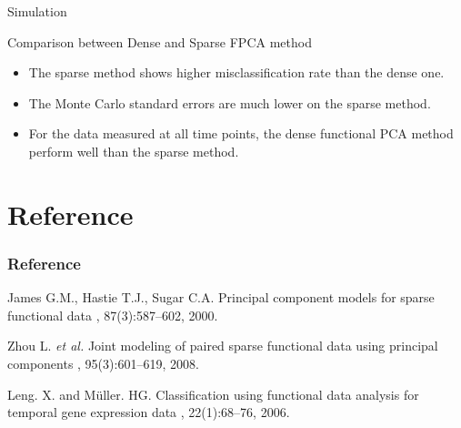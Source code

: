 \documentclass{beamer}
\begin{document}
\begin{frame}{Simulation}
	\begin{block}{Comparison between Dense and Sparse FPCA method}
		\vspace{0.1cm}
		\begin{itemize}
			\item {
				The sparse method shows higher misclassification rate than the dense one.
			}
			\item {
				The Monte Carlo standard errors are much lower on the sparse method.
			}
			\item {
				For the data measured at all time points, the dense functional PCA method perform well than the sparse method.
			}
		\end{itemize}
	\end{block}
\end{frame}


\appendix
\section{Reference}
\begin{frame}
  \frametitle<presentation>{Reference}
    
  \begin{thebibliography}{10}
  	\beamertemplatearticlebibitems
		James G.M., Hastie T.J., Sugar C.A.
		\newblock Principal component models for sparse functional data
		, 87(3):587--602,
		2000.
		
   	\beamertemplatearticlebibitems
		 Zhou L. \textit{et al.}
		 \newblock Joint modeling of paired sparse functional data using principal components
		 , 95(3):601--619,
		 2008.
    
    \beamertemplatearticlebibitems
    Leng. X. and Müller. HG.
    \newblock Classification using functional data analysis for temporal gene expression data
    , 22(1):68--76,
    2006.

  \end{thebibliography}
\end{frame}
\end{document}
